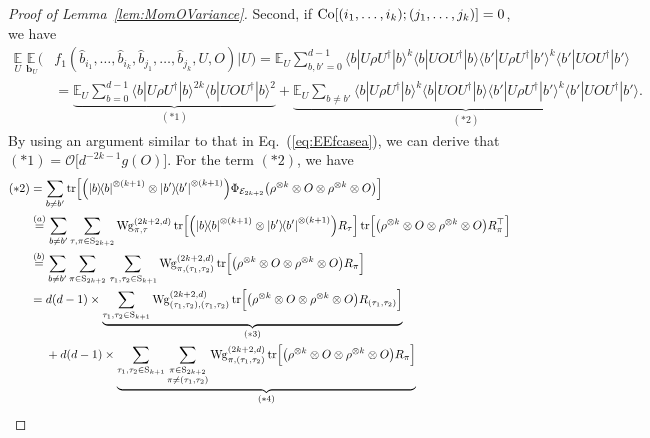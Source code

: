 \documentclass[aps,prl,twocolumn,nofootinbib,superscriptaddress,10pt]{revtex4-2}
\let\originalleft\left
\let\originalright\right
\renewcommand{\left}{\mathopen{}\mathclose\bgroup\originalleft}
\renewcommand{\right}{\aftergroup\egroup\originalright}
\def\E{ {\mathbb E} } %
\def\>{\rangle}
\def\<{\langle}
\newcommand{\ketbra}[2]{\ensuremath{\left|#1\right\rangle\!\left\langle#2\right|}}
\DeclareMathOperator{\Tr}{tr}
\theoremstyle{plain}
\theoremstyle{definition}
\newcommand{\Wg}{\mathrm{Wg}}
\newcommand{\eref}[1]{Eq.~\textup{(\ref{#1})}}
\newcommand{\lref}[1]{Lemma~\ref{#1}}
\begin{document}
\begin{proof}[Proof of \lref{lem:MomOVariance}]
Second, if ${\rm Co}[(i_1,\dots,i_k);(j_1,\dots,j_k)]=0$, we have 
\begin{align}\label{eq:EEfcaseb}
\underset{U }{\E} \, \underset{\,\mathbf{b}_{U}}{\E} \Big(
&f_1(\hat{b}_{i_1},\dots,\hat{b}_{i_k},\hat{b}_{j_1},\dots,\hat{b}_{j_k}, U,O)\Big| U \Big)
= 
\E_{U} \sum_{b,b'=0}^{d-1} \<b|U\rho U^{\dag}|b\>^{k} \<b|UO U^{\dag}|b\> \<b'|U\rho U^{\dag}|b'\>^{k}\<b'|UO U^{\dag}|b'\>
\nonumber\\
&=
\underbrace{\E_{U} \sum_{b=0}^{d-1} \<b|U\rho U^{\dag}|b\>^{2k}\<b|UO U^{\dag}|b\>^2}_{(*1)}
+\underbrace{\E_{U} \sum_{b\ne b'} \<b|U\rho U^{\dag}|b\>^{k}\<b|UO U^{\dag}|b\> \<b'|U\rho U^{\dag}|b'\>^{k}\<b'|UO U^{\dag}|b'\>}_{(*2)}. 
\end{align}
By using an argument similar to that in \eref{eq:EEfcasea}, we can derive that $(*1)=\mathcal O \big[d^{-2k-1}g(O)\big]$. 
For the term $(*2)$, we have  
\begin{align}\label{eq:EEfcased}
(*2)&=  \sum_{b\ne b'} \Tr\left[ \left( \ketbra{b}{b}^{\otimes (k+1)}\otimes \ketbra{b'}{b'}^{\otimes (k+1)}\right)  
\Phi_{\mathcal E_{2k+2}}\left( \rho^{\otimes k} \otimes O\otimes\rho^{\otimes k} \otimes O \right) \right]
\nonumber\\
&\stackrel{(a)}{=}\sum_{b\ne b'} \sum_{\tau,\pi\in \mathrm{S}_{2k+2}} \Wg_{\pi,\tau}^{(2k+2,d)} 
\Tr\left[ \left( \ketbra{b}{b}^{\otimes (k+1)}\otimes \ketbra{b'}{b'}^{\otimes (k+1)}\right) R_{\tau} \right] 
\Tr\!\Big[ \left( \rho^{\otimes k} \otimes O\otimes\rho^{\otimes k} \otimes O \right) R_{\pi}^{\top} \Big]
\nonumber\\
&\stackrel{(b)}{=}\sum_{b\ne b'} \sum_{\pi\in \mathrm{S}_{2k+2}} \sum_{\,\tau_1,\tau_2\in \mathrm{S}_{k+1}}
\Wg_{\pi,(\tau_1,\tau_2)}^{(2k+2,d)}
\Tr\!\Big[ \left( \rho^{\otimes k} \otimes O\otimes\rho^{\otimes k} \otimes O \right) R_{\pi} \Big]
\nonumber\\
&=d(d-1)\times \underbrace{\sum_{\tau_1,\tau_2\in \mathrm{S}_{k+1}}
\Wg_{(\tau_1,\tau_2),(\tau_1,\tau_2)}^{(2k+2,d)}  
\Tr\!\Big[ \left( \rho^{\otimes k} \otimes O\otimes\rho^{\otimes k} \otimes O \right) R_{(\tau_1,\tau_2)} \Big]}_{(*3)}
\nonumber\\
&\quad\ 
+d(d-1)\times \underbrace{\sum_{\tau_1,\tau_2\in \mathrm{S}_{k+1}}
\sum_{\substack{\pi\in\mathrm{S}_{2k+2}\\ \pi\ne(\tau_1,\tau_2)}} 
\Wg_{\pi,(\tau_1,\tau_2)}^{(2k+2,d)}  
\Tr\!\Big[ \left( \rho^{\otimes k} \otimes O\otimes\rho^{\otimes k} \otimes O \right) R_{\pi} \Big]}_{(*4)}
\nonumber\\ 

\end{align}
\end{proof}
\end{document}
